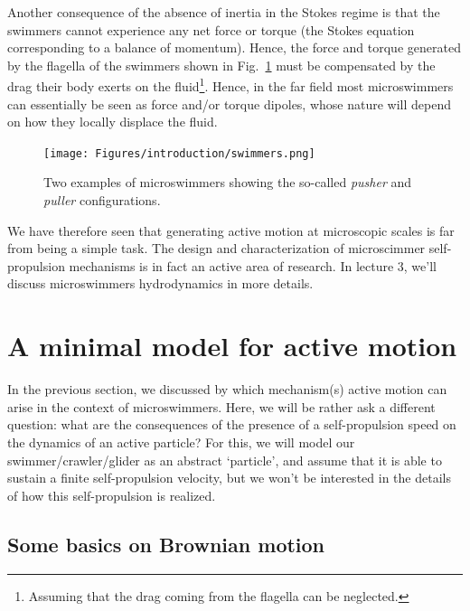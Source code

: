 Another consequence of the absence of inertia in the Stokes regime is that the swimmers cannot experience any net force or torque (the Stokes equation corresponding to a balance of momentum).
Hence, the force and torque generated by the flagella of the swimmers shown in Fig.~\ref{fig: swimmers} must be compensated by the drag their body exerts on the fluid\footnote{Assuming that the drag coming from the flagella can be neglected.}. 
Hence, in the far field most microswimmers can essentially be seen as force and/or torque dipoles, whose nature will depend on how they locally displace the fluid.

\begin{figure}[!htb]
    \centering
    \texttt{[image: Figures/introduction/swimmers.png]}
    \caption{Two examples of microswimmers showing the so-called \textit{pusher} and \textit{puller} configurations.}
    \label{fig: swimmers}
\end{figure}

We have therefore seen that generating active motion at microscopic scales is far from being a simple task. The design and characterization of microscimmer self-propulsion mechanisms is in fact an active area of research. 
In lecture 3, we'll discuss microswimmers hydrodynamics in more details.


\section{A minimal model for active motion}


In the previous section, we discussed by which mechanism(s) active motion can arise in the context of microswimmers.
Here, we will be rather ask a different question: what are the consequences of the presence of a self-propulsion speed on the dynamics of an active particle?
For this, we will model our swimmer/crawler/glider as an abstract `particle', and assume that it is able to sustain a finite self-propulsion velocity, but we won't be interested in the details of how this self-propulsion is realized.


\subsection{Some basics on Brownian motion}

